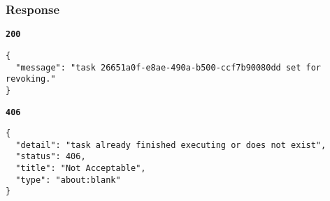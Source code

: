 \subsubsection{Response}
\textbf{\texttt{200}}
\begin{lstlisting}
{
  "message": "task 26651a0f-e8ae-490a-b500-ccf7b90080dd set for revoking."
}
\end{lstlisting}

\textbf{\texttt{406}}
\begin{lstlisting}
{
  "detail": "task already finished executing or does not exist",
  "status": 406,
  "title": "Not Acceptable",
  "type": "about:blank"
}
\end{lstlisting}